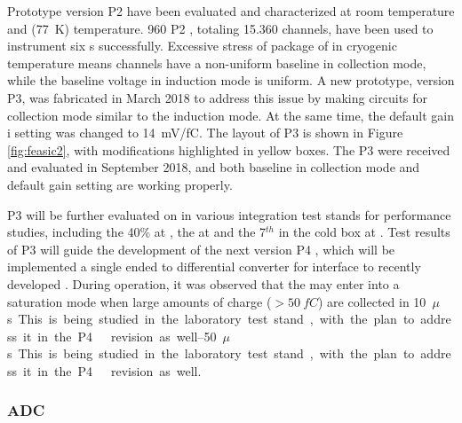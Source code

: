 Prototype version P2   have been evaluated and 
characterized at room temperature and \lntwo (\SI{77}{K}) temperature. 
\num{960} P2  , totaling \num{15,360} channels, 
have been used to instrument six  s successfully. 
Excessive stress of package of   in cryogenic 
temperature means  channels have a non-uniform baseline in 
collection mode, while the baseline  voltage in induction mode 
is uniform. A new prototype, version P3, was fabricated in March 2018 
to address this issue by making  circuits for collection mode 
similar to the induction mode. At the same time, the default gain i
setting was changed to \SI{14}{mV/fC}. The layout of P3  
 is shown in Figure \ref{fig:feasic2}, with modifications 
highlighted in yellow boxes. The P3   were 
received and evaluated in September 2018, and both baseline in collection 
mode and default gain setting are working properly.


P3   will be further evaluated on  
in various integration test stands for performance studies, including 
the \num{40}\%  at , the   
at  and the \num{7}$^{th}$   
in the cold box at . Test results of P3   
will guide the development of the next version P4  , 
which will be implemented a single ended to differential converter for 
interface to recently developed . During  
operation, it was observed that the   may enter 
into a saturation mode when large amounts of charge ($>\SI{50}{fC}$) 
are collected in \SIrange{10}{50}{$\mu$s}. This is being studied in 
the laboratory test stand, with the plan to address it in the P4 
  revision as well.

\subsubsection{ADC }
\label{sec:fdsp-tpcelec-design-femb-adc}

